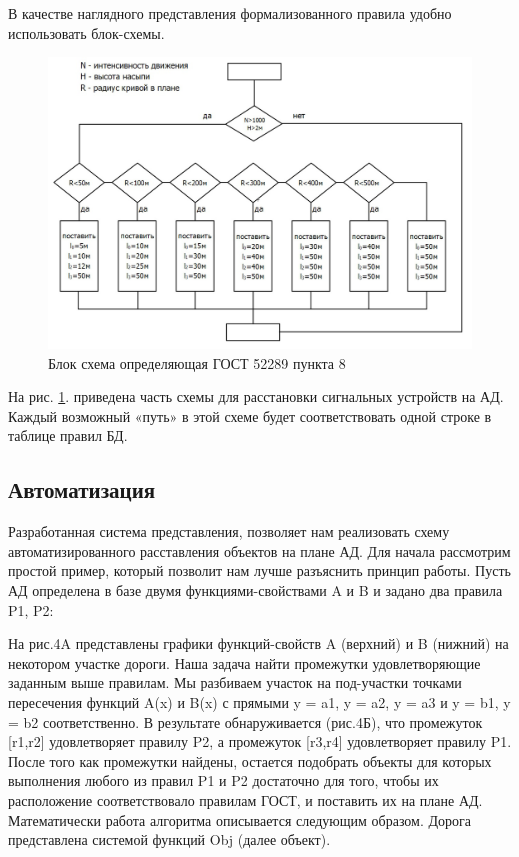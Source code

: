 В качестве наглядного представления формализованного правила удобно использовать блок-схемы. 

\begin{figure}[h]
	\centering
	\includegraphics[scale=1]{images/auto_scheme_2}
	\caption{Блок схема определяющая ГОСТ 52289 пункта 8}
	\label{auto_scheme_2}
\end{figure}

На рис. \ref{auto_scheme_2}. приведена часть схемы для расстановки сигнальных устройств на АД. Каждый возможный «путь» в этой схеме будет соответствовать одной строке в таблице правил БД. 

\subsection{Автоматизация}
Разработанная система представления, позволяет нам реализовать схему автоматизированного расставления объектов на плане АД. Для начала рассмотрим простой пример, который позволит нам лучше разъяснить принцип работы. Пусть АД определена в базе двумя функциями-свойствами A и B и задано два правила P1, P2:

На рис.4A представлены графики функций-свойств A (верхний) и B (нижний) на некотором участке дороги. Наша задача найти промежутки удовлетворяющие заданным выше правилам. Мы разбиваем участок на под-участки точками пересечения функций A(x) и B(x) с прямыми y = a1, y = a2, y = a3 и y = b1, y = b2  соответственно. В результате обнаруживается (рис.4Б), что промежуток [r1,r2] удовлетворяет правилу P2, а промежуток [r3,r4] удовлетворяет правилу P1. После того как промежутки найдены, остается подобрать объекты для которых выполнения любого из правил P1 и P2 достаточно для того, чтобы их расположение соответствовало правилам ГОСТ, и поставить их на плане АД. 
Математически работа алгоритма описывается следующим образом. Дорога представлена системой функций Obj (далее объект). 

